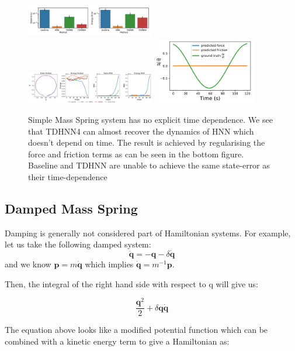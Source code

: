 \documentclass[twoside]{article}
\begin{document}
\begin{figure}[h!]
\centering
\includegraphics[width=0.5\textwidth]{figures/mass_spring_errors.pdf}
\includegraphics[width=0.5\textwidth]{figures/mass_spring_long.pdf}
\includegraphics[width=0.4\textwidth]{figures/mass_spring_pred_force.pdf}
\caption{Simple Mass Spring system has no explicit time dependence. We see that TDHNN4 can almost recover the dynamics of HNN which doesn't depend on time. The result is achieved by regularising the force and friction terms as can be seen in the bottom figure. Baseline and TDHNN are unable to achieve the same state-error as their time-dependence }
\label{mspring}
\end{figure}


\subsection{Damped Mass Spring}

Damping is generally not considered part of Hamiltonian systems. For example, let us take the following damped system:
\begin{equation}
\ddot{\mathbf{q}} = -\mathbf{q} - \delta\dot{\mathbf{q}}
\end{equation}
and we know $\mathbf{p}=m\dot{\mathbf{q}}$ which implies $\dot{\mathbf{q}} = m^{-1}\mathbf{p}$.

Then, the integral of the right hand side with respect to q will give us:

\begin{equation}
\frac{\mathbf{q}^2}{2} + \delta \mathbf{q} \dot{\mathbf{q}}
\end{equation}

The equation above looks like a modified potential function which can be combined with a kinetic energy term to give a Hamiltonian as:
\end{document}
